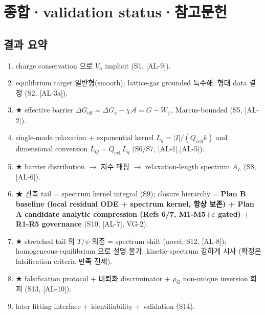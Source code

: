 \documentclass[11pt,a4paper]{article}
\newcommand{\eff}{\mathrm{eff}}
\newcommand{\cell}{\mathrm{cell}}
\newcommand{\AL}[1]{\textsf{[AL-#1]}}
\begin{document}
\section{종합·validation status·참고문헌}\label{sec:summary}
\subsection{결과 요약}
\begin{enumerate}[label=\textbf{(R\arabic*)}]
\item charge conservation 으로 $V_n$ implicit (S1, \AL{9}).
\item equilibrium target 일반형(smooth); lattice-gas grounded 특수해, 형태 data 결정 (S2, \AL{3a}).
\item ★ effective barrier $\Delta G_\eff=\Delta G_a-\chi\mathcal A=G-W_\psi$, Marcus-bounded (S5, \AL{2}).
\item single-mode relaxation + exponential kernel $L_q=|I|/(Q_\cell k)$ and dimensional conversion $L_Q=Q_\cell L_q$ (S6/S7, \AL{1},\AL{5}).
\item ★ barrier distribution $\to$ 지수 매핑 $\to$ relaxation-length spectrum $A_L$ (S8, \AL{6}).
\item ★ 관측 tail = spectrum kernel integral (S9); closure hierarchy = \textbf{Plan B baseline (local residual ODE + spectrum kernel, 항상 보존) + Plan A candidate analytic compression (Refs 6/7, M1-M5+$\varepsilon$ gated) +
  R1-R5 governance} (S10, \AL{7}, VG-2).
\item ★ stretched tail 의 $T/\psi$ 의존 = spectrum shift (novel; S12, \AL{8}); homogeneous-equilibrium 으로 설명 불가, kinetic-spectrum 강하게 시사 (확정은 falsification criteria 만족 전제).
\item ★ falsification protocol + 비퇴화 discriminator + $\rho_G$ non-unique inversion 회피 (S13, \AL{10}).
\item later fitting interface + identifiability + validation (S14).
\end{enumerate}
\end{document}
